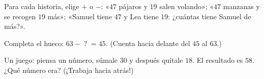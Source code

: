 \begin{exercise}[$\star$]\label{exo:g2:subtraction:8}
Para cada historia, elige $+$ o $-$: «$47$ pájaros y $19$ salen volando»;
«$47$ manzanas y se recogen $19$ más»; «Samuel tiene $47$ y Lea tiene $19$:
¿cuántas tiene Samuel de más?».
\end{exercise}

\begin{exercise}[$\star$]\label{exo:g2:subtraction:9}
Completa el hueco: $63 - \;?\; = 45$. (Cuenta hacia delante del $45$ al $63$.)
\end{exercise}

\begin{exercise}[$\star\star$]\label{exo:g2:subtraction:10}
Un juego: piensa un número, súmale $30$ y después quítale $18$. El
resultado es $58$. ¿Qué número era? (¡Trabaja hacia atrás!)
\end{exercise}
